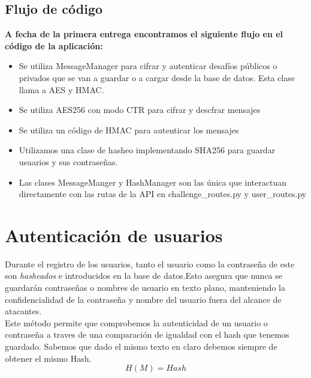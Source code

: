 \documentclass[a4paper,11pt]{article}
\begin{document}
\vspace{0.5cm}

\subsection{Flujo de código}
\textbf{A fecha de la primera entrega encontramos el siguiente flujo en el código de la aplicación:} 
\begin{itemize}
    \item Se utiliza MessageManager para cifrar y autenticar desafíos públicos o privados que se van a guardar o a cargar desde la base de datos. Esta clase llama a AES y HMAC.
    \item Se utiliza AES256 con modo CTR para cifrar y descfrar mensajes
    \item Se utiliza un código de HMAC para autenticar los mensajes
    \item Utilizamos una clase de hasheo implementando SHA256 para guardar usuarios y sus contraseñas.
    \item Las clases MessageManger y HashManager son las única que interactuan directamente con las rutas de la API en challenge\_routes.py y user\_routes.py
\end{itemize}

\section{Autenticación de usuarios}
\label{sec:autenticacionUsuarios}
Durante el registro de los usuarios, tanto el usuario como la contraseña de este
son \textit{hasheados} e introducidos en la base de datos.Esto asegura que nunca
se guardarán contraseñas o nombres de usuario en texto plano, manteniendo la
confidencialidad de la contraseña y nombre del usuario fuera del alcance de atacantes.
\\
Este método permite que comprobemos la autenticidad de un usuario o
contraseña a traves de una comparación de igualdad con el hash que tenemos
guardado. Sabemos que dado el mismo texto en claro debemos siempre de obtener el
mismo Hash.
$$H(M) = Hash$$
\end{document}
